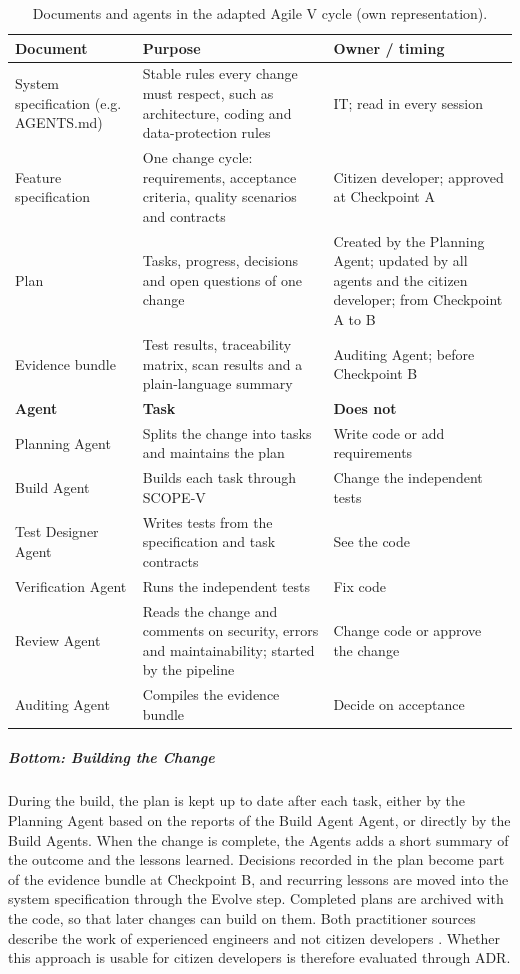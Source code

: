 \documentclass[10pt,a4paper]{article}
\begin{document}
\begin{table}[H]
    \centering
    \small
    \caption{Documents and agents in the adapted Agile V cycle (own representation).}
    \label{tab:agile-v-artefacts}
    \begin{tabular}{p{3.2cm} p{6.2cm} p{4.2cm}}
    \hline
    \textbf{Document} & \textbf{Purpose} & \textbf{Owner / timing} \\
    \hline
    System specification (e.g. AGENTS.md) & Stable rules every change must respect, such as architecture, coding and data-protection rules & IT; read in every session \\
    Feature specification & One change cycle: requirements, acceptance criteria, quality scenarios and contracts & Citizen developer; approved at Checkpoint A \\
    Plan & Tasks, progress, decisions and open questions of one change & Created by the Planning Agent; updated by all agents and the citizen developer; from Checkpoint A to B \\
    Evidence bundle & Test results, traceability matrix, scan results and a plain-language summary & Auditing Agent; before Checkpoint B \\
    \hline
    \textbf{Agent} & \textbf{Task} & \textbf{Does not} \\
    \hline
    Planning Agent & Splits the change into tasks and maintains the plan & Write code or add requirements \\
    Build Agent & Builds each task through SCOPE-V & Change the independent tests \\
    Test Designer Agent & Writes tests from the specification and task contracts & See the code \\
    Verification Agent & Runs the independent tests & Fix code \\
    Review Agent & Reads the change and comments on security, errors and
        maintainability; started by the pipeline & Change code or approve
        the change \\
    Auditing Agent & Compiles the evidence bundle & Decide on acceptance \\
    \hline
    \end{tabular}
    \end{table}


\subparagraph{Bottom: Building the Change}

During the build, the plan is kept up to date after each task, either by the Planning Agent based on the reports of the Build Agent Agent, or directly by the Build Agents. When the change is complete, the Agents adds a short summary of the outcome and the lessons learned. Decisions recorded in the plan become part of the evidence bundle at Checkpoint B, and recurring lessons are moved into the system specification through the Evolve step. Completed plans are archived with the code, so that later changes can build on them. Both practitioner sources describe the work of experienced engineers and not citizen developers \parencite{friel2025,lopopolo2026HarnessEngineering}. Whether this approach is usable for citizen developers is therefore evaluated through ADR.
\end{document}
